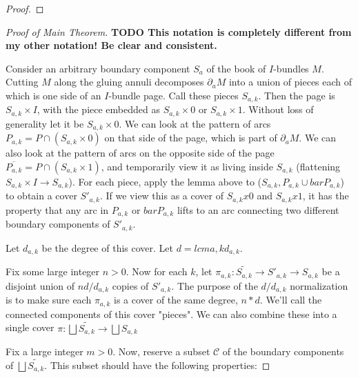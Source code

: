 \documentclass[12pt]{amsart}
\theoremstyle{definition}
\theoremstyle{remark}
\newcommand{\bd}{\partial}
\newcommand{\cC}{\mathcal{C}}
\begin{document}
\begin{proof}
\end{proof}

\begin{proof}[Proof of Main Theorem]


\textbf{ TODO This notation is completely different from my other notation! Be
clear and consistent.}

Consider an arbitrary boundary component $S_a$ of the book of $I$-bundles $M$.
Cutting $M$ along the gluing annuli decomposes $\bd_aM$ into a union of pieces
each of which is one side of an $I$-bundle page. Call these pieces $S_{a,k}$.
Then the page is $S_{a,k}\times I$, with the piece embedded as $S_{a,k}\times
0$ or $S_{a,k}\times 1$. Without loss of generality let it be $S_{a,k}\times
0$. We can look at the pattern of arcs $P_{a,k} = P \cap (S_{a,k}\times 0)$ on
that side of the page, which is part of $\bd_aM$. We can also look at the pattern
of arcs on the opposite side of the page $\overline{P_{a,k}} = P \cap
(S_{a,k}\times 1)$, and temporarily view it as living inside $S_{a,k}$
(flattening $S_{a,k}\times I \to S_{a,k}$).  For each piece, apply the lemma
above to ($S_{a,k},P_{a,k} \cup barP_{a,k}$) to obtain a cover $S'_{a,k}$. If we
view this as a cover of $S_{a,k}x0$ and $S_{a,k}x1$, it has the property that
any arc in $P_{a,k}$ or $barP_{a,k}$ lifts to an arc connecting two different
boundary components of $S'_{a,k}$.

Let $d_{a,k}$ be the degree of this cover. Let $d = lcm a,k d_{a,k}$.

Fix some large integer $n>0$. Now for each $k$, let $\pi_{a,k}
\colon \widetilde{S_{a,k}} \to S'_{a,k} \to S_{a,k}$ be a disjoint union of $nd/d_{a,k}$
copies of $S'_{a,k}$. The purpose of the $d/d_{a,k}$ normalization is to make sure
each $\pi_{a,k}$ is a cover of the same degree, $n*d$.  We'll call the connected
components of this cover "pieces". We can also combine these into a single
cover $\pi \colon \bigsqcup \widetilde{S_{a,k}} \to \bigsqcup S_{a,k}$

Fix a large integer $m>0$. Now, reserve a subset $\cC$ of the boundary
components of $\bigsqcup \widetilde{S_{a,k}}$.  This subset should have the following
properties:


\end{proof}
\end{document}
